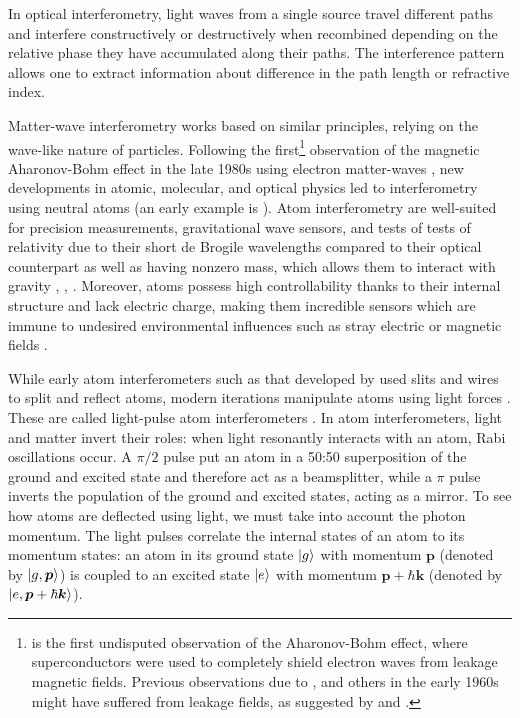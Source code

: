 \documentclass[reprint,
nofootinbib,
amsmath,amssymb,
aps]{revtex4-1}
\begin{document}
In optical interferometry, light waves from a single source travel different paths and interfere constructively or destructively when recombined depending on the relative phase they have accumulated along their paths. The interference pattern allows one to extract information about difference in the path length or refractive index.


Matter-wave interferometry works based on similar principles, relying on the wave-like nature of particles. Following the first\footnote{\cite{tonomura1986evidence} is the first undisputed observation of the Aharonov-Bohm effect, where superconductors were used to completely shield electron waves from leakage magnetic fields. Previous observations due to \cite{chambers1960shift}, \cite{fowler1961electron} and others in the early 1960s might have suffered from leakage fields, as suggested by \cite{bocchieri1978nonexistence} and \cite{roy1980condition}.   } observation of the magnetic Aharonov-Bohm effect in the late 1980s using electron matter-waves \cite{tonomura1986evidence}, new developments in atomic, molecular, and optical physics led to interferometry using neutral atoms (an early example is \cite{keith1991interferometer}). Atom interferometry are well-suited for precision measurements, gravitational wave sensors, and tests of tests of relativity due to their short de Brogile wavelengths compared to their optical counterpart as well as having nonzero mass, which allows them to interact with gravity \cite{mueller2014quantum}, \cite{dimopoulos2009gravitational}, \cite{stray2022quantum}. Moreover, atoms possess high controllability thanks to their internal structure and lack electric charge, making them incredible sensors which are immune to undesired environmental influences such as stray electric or magnetic fields \cite{bongs2019taking}. 


While early atom interferometers such as that developed by \cite{keith1991interferometer} used slits and wires to split and reflect atoms, modern iterations manipulate atoms using light forces \cite{rasel1995atom}. These are called light-pulse atom interferometers \cite{kasevich1992measurement}. In atom interferometers, light and matter invert their roles: when light resonantly interacts with an atom, Rabi oscillations occur. A $\pi/2$ pulse put an atom in a 50:50 superposition of the ground and excited state and therefore act as a beamsplitter, while a $\pi$ pulse inverts the population of the ground and excited states, acting as a mirror.  To see how atoms are deflected using light, we must take into account the photon momentum. The light pulses correlate the internal states of an atom to its momentum states: an atom in its ground state $\ket{g}$ with momentum $\bm{p}$ (denoted by $\ket{g,\bm{p}}$) is coupled to an excited state $\ket{e}$ with momentum $\bm{p} + \hbar \bm{k}$ (denoted by $\ket{e,\bm{p} + \hbar\bm{k}}$).  
\end{document}
